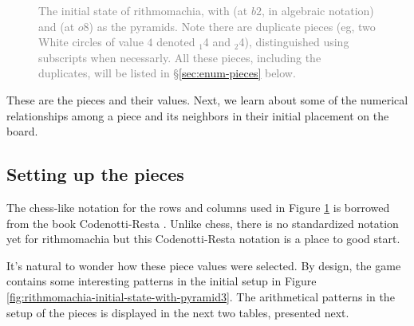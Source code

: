 \documentclass[12pt]{article}
\begin{document}
\begin{center}
\begin{figure}[h!]
\begin{tabular}{c|c|c|c|c|c|c|c|c|}
\end{tabular}
\newline
\caption{{\small{
      \textcolor{gray}{The initial state of rithmomachia, with \rhombus (at $b2$, in algebraic notation) and \rhombusfill
        (at $o8$) as the pyramids.
        Note there are duplicate pieces (eg, two White circles of value $4$ denoted \circlet$_1$4 and \circlet$_2$4),
        distinguished using subscripts when necessarly. All these pieces, including the duplicates, will be listed in
      \S \ref{sec:enum-pieces} below.}
}}}
\label{fig:latex-table}
\end{figure}
\end{center}


These are the pieces and their values. 
Next, we learn about some of the numerical relationships among
a piece and its neighbors in their initial placement on the board.


\subsection{Setting up the pieces}
\label{sec:setup-pieces}


The chess-like notation for the rows and columns used in
Figure \ref{fig:latex-table} is borrowed from the book
Codenotti-Resta \cite{CR22}.
Unlike chess, there is no standardized notation yet for rithmomachia
but this Codenotti-Resta notation is a place to good start.

It's natural to wonder how these piece values were selected.
By design, the game contains some interesting patterns in the
initial setup in Figure \ref{fig:rithmomachia-initial-state-with-pyramid3}.
The arithmetical patterns in the setup of the pieces is displayed in the
next two tables, presented next.
\end{document}
